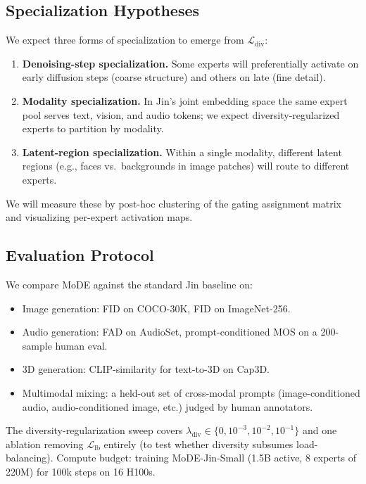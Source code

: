 \documentclass[11pt,a4paper]{article}
\begin{document}
\subsection{Specialization Hypotheses}

We expect three forms of specialization to emerge from $\mathcal{L}_\text{div}$:

\begin{enumerate}
  \item \textbf{Denoising-step specialization.} Some experts will preferentially activate on early
        diffusion steps (coarse structure) and others on late (fine detail).
  \item \textbf{Modality specialization.} In Jin's joint embedding space the same expert pool serves
        text, vision, and audio tokens; we expect diversity-regularized experts to partition by
        modality.
  \item \textbf{Latent-region specialization.} Within a single modality, different latent regions
        (e.g., faces vs.\ backgrounds in image patches) will route to different experts.
\end{enumerate}

We will measure these by post-hoc clustering of the gating assignment matrix and visualizing per-expert
activation maps.

\subsection{Evaluation Protocol}

We compare MoDE against the standard Jin baseline on:

\begin{itemize}
  \item Image generation: FID on COCO-30K, FID on ImageNet-256.
  \item Audio generation: FAD on AudioSet, prompt-conditioned MOS on a 200-sample human eval.
  \item 3D generation: CLIP-similarity for text-to-3D on Cap3D.
  \item Multimodal mixing: a held-out set of cross-modal prompts (image-conditioned audio,
        audio-conditioned image, etc.) judged by human annotators.
\end{itemize}

The diversity-regularization sweep covers $\lambda_\text{div} \in \{0, 10^{-3}, 10^{-2}, 10^{-1}\}$
and one ablation removing $\mathcal{L}_\text{lb}$ entirely (to test whether diversity subsumes
load-balancing). Compute budget: training MoDE-Jin-Small (1.5B active, 8 experts of 220M) for 100k
steps on 16 H100s.
\end{document}
